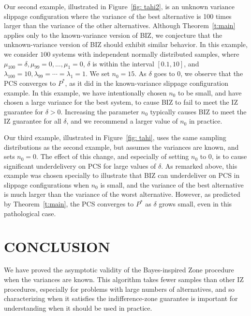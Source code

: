 \documentclass{wscpaperproc}
\theoremstyle{wsc}
\providecommand{\DIFaddtex}[1]{{\protect\color{blue}\uwave{#1}}} %
\providecommand{\DIFaddbegin}{} %
\providecommand{\DIFaddend}{} %
\providecommand{\DIFadd}[1]{\texorpdfstring{\DIFaddtex{#1}}{#1}} %
\begin{document}
Our second example, illustrated in Figure~\ref{fig: tahi2}, is an unknown variance slippage configuration where the variance of the best alternative is 100 times larger than the variance of the other alternatives. Although Theorem~\ref{t:main} applies only to the known-variance version of BIZ, we conjecture that the unknown-variance version of BIZ should exhibit similar behavior.
In this example, we consider $100$ systems with independent normally distributed samples, where $\mu_{100}=\delta,\mu_{99}=0,\dots,\mu_{1}=0$, $\delta$ is within the interval $[0.1,10]$, and $\lambda_{100}=10,\lambda_{99}=\cdots=\lambda_{1}=1$. We set $n_{0}=15$.
As $\delta$ goes to $0$, we observe that the PCS converges to $P^*$, as it did in the known-variance slippage configuration example.
In this example, we have intentionally chosen $n_0$ to be small, and have chosen a large variance for the best system, to cause BIZ to fail to meet the IZ guarantee for $\delta>0$.
Increasing the parameter $n_0$ typically causes BIZ to meet the IZ guarantee for all $\delta$, and we recommend a larger value of $n_0$ in practice.

Our third example, illustrated in Figure~\ref{fig: tahi}, uses the same sampling distributions as the second example, but assumes the variances are known, and sets $n_0=0$.
The effect of this change, and especially of setting $n_0$ to $0$, is to cause significant underdelivery on PCS for large values of $\delta$.  
As remarked above, this example was chosen specially to illustrate that BIZ can underdeliver on PCS in slippage configurations when $n_0$ is small, and the variance of the best alternative is much larger than the variance of the worst alternative.  However, as predicted by Theorem~\ref{t:main}, the PCS converges to $P^*$ as $\delta$ grows small, even in this pathological case. 




\section{CONCLUSION}
\DIFaddbegin \label{conclusion}
\DIFaddend 

We have proved the asymptotic validity of the Bayes-inspired \DIFaddbegin \DIFadd{Indifference }\DIFaddend Zone
procedure \cite{Frazier:BIZ} when the variances are known.
This algorithm takes fewer samples than other IZ procedures, especially for
problems with large numbers of alternatives, and so characterizing when it
satisfies the indifference-zone guarantee is important for understanding when
it should be used in practice.
\end{document}
